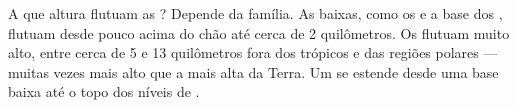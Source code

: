 A que altura flutuam as ? Depende da família. As  baixas, como
os  e a base dos , flutuam desde pouco acima do chão até
cerca de 2 quilômetros. Os  flutuam muito alto, entre cerca de 5 e 13
quilômetros fora dos trópicos e das regiões polares --- muitas vezes mais
alto que a  mais alta da Terra.
Um  se estende desde uma base baixa até o topo dos níveis de
.

